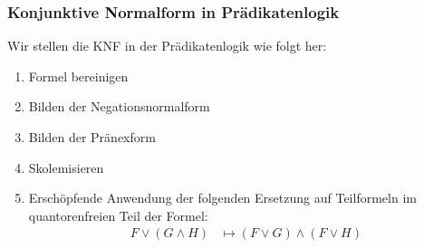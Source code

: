 \documentclass[aspectratio=1610,onlymath]{beamer}
\begin{document}
\begin{frame}\frametitle{Konjunktive Normalform in Prädikatenlogik}

\medskip

Wir stellen die KNF in der Prädikatenlogik wie folgt her:
\begin{enumerate}[(1)]
\item Formel bereinigen
\item Bilden der Negationsnormalform
\item Bilden der Pränexform
\item Skolemisieren
\item Erschöpfende Anwendung der folgenden Ersetzung auf Teilformeln im quantorenfreien Teil der Formel:
\begin{align*}
F\vee(G\wedge H) &\mapsto (F\vee G)\wedge (F\vee H)
\end{align*}
\end{enumerate}
\end{frame}
\end{document}
